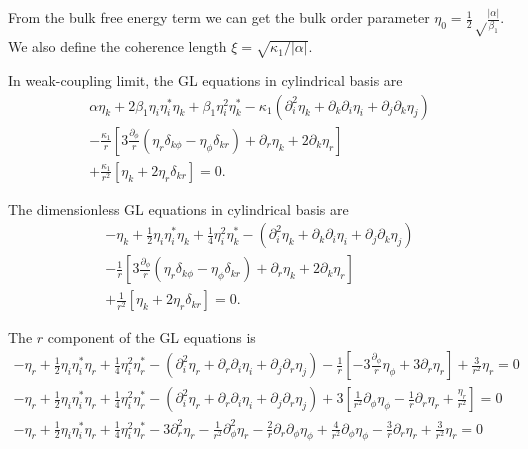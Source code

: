 \documentclass[aps,prl,preprint]{revtex4-2}
\begin{document}
From the bulk free energy term we can get the bulk order parameter
$\eta_0 = \frac{1}{2}\sqrt\frac{|\alpha|}{\beta_1}$.
We also define the coherence length $\xi = \sqrt{\kappa_1/|\alpha|}$.

In weak-coupling limit, the GL equations in cylindrical basis are
\begin{align}
    \alpha\eta_k+2\beta_1\eta_i\eta_i^*\eta_k
    +\beta_1\eta_i^2\eta_k^*
    -\kappa_1\left(\partial_i^2\eta_k
    +\partial_k\partial_i\eta_i
    +\partial_j\partial_k\eta_j\right)\nonumber\\
    -\frac{\kappa_1}{r}\left[3\frac{\partial_\phi}{r}
    \left(\eta_r\delta_{k\phi}-\eta_\phi\delta_{kr}\right)+\partial_r\eta_k
    +2\partial_k\eta_r\right]\nonumber\\
    +\frac{\kappa_1}{r^2}\left[\eta_k+2\eta_r\delta_{kr}\right]=0.
\end{align}

The dimensionless GL equations in cylindrical basis are
\begin{align}
    -\eta_k+\frac{1}{2}\eta_i\eta_i^*\eta_k
    +\frac{1}{4}\eta_i^2\eta_k^*
    -(\partial_i^2\eta_k
    +\partial_k\partial_i\eta_i
    +\partial_j\partial_k\eta_j)\nonumber\\
    -\frac{1}{r}\left[3\frac{\partial_\phi}{r}
    \left(\eta_r\delta_{k\phi}-\eta_\phi\delta_{kr}\right)+\partial_r\eta_k
    +2\partial_k\eta_r\right]\nonumber\\
    +\frac{1}{r^2}\left[\eta_k+2\eta_r\delta_{kr}\right]=0.
\end{align}

The $r$ component of the GL equations is
\begin{align}
    -\eta_r+\frac{1}{2}\eta_i\eta_i^*\eta_r
    +\frac{1}{4}\eta_i^2\eta_r^*
    -(\partial_i^2\eta_r
    +\partial_r\partial_i\eta_i
    +\partial_j\partial_r\eta_j)
    -\frac{1}{r}\left[-3\frac{\partial_\phi}{r}\eta_\phi
    +3\partial_r\eta_r\right]
    +\frac{3}{r^2}\eta_r=0 \nonumber\\
    -\eta_r+\frac{1}{2}\eta_i\eta_i^*\eta_r
    +\frac{1}{4}\eta_i^2\eta_r^*
    -(\partial_i^2\eta_r
    +\partial_r\partial_i\eta_i
    +\partial_j\partial_r\eta_j)
    +3\left[\frac{1}{r^2}\partial_\phi\eta_\phi
    -\frac{1}{r}\partial_r\eta_r + \frac{\eta_r}{r^2}\right]=0 \nonumber\\
    -\eta_r+\frac{1}{2}\eta_i\eta_i^*\eta_r
    +\frac{1}{4}\eta_i^2\eta_r^*
    -3\partial_r^2\eta_r - \frac{1}{r^2}\partial_\phi^2\eta_r
    -\frac{2}{r}\partial_r\partial_\phi\eta_\phi
    +\frac{4}{r^2}\partial_\phi\eta_\phi
    -\frac{3}{r}\partial_r\eta_r + \frac{3}{r^2}\eta_r=0 \nonumber
\end{align}
\end{document}
